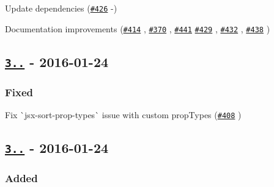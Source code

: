 \begin{DoxyItemize}
\item Update dependencies (\href{https://github.com/yannickcr/eslint-plugin-react/pull/426}{\tt \#426} -\/)
\item Documentation improvements (\href{https://github.com/yannickcr/eslint-plugin-react/pull/414}{\tt \#414} , \href{https://github.com/yannickcr/eslint-plugin-react/pull/370}{\tt \#370} , \href{https://github.com/yannickcr/eslint-plugin-react/pull/441}{\tt \#441} \href{https://github.com/yannickcr/eslint-plugin-react/pull/429}{\tt \#429} , \href{https://github.com/yannickcr/eslint-plugin-react/pull/432}{\tt \#432} , \href{https://github.com/yannickcr/eslint-plugin-react/pull/438}{\tt \#438} )
\end{DoxyItemize}

\subsection*{\href{https://github.com/yannickcr/eslint-plugin-react/compare/v3.16.0...v3.16.1}{\tt 3..} -\/ 2016-\/01-\/24}

\subsubsection*{Fixed}


\begin{DoxyItemize}
\item Fix \`{}jsx-\/sort-\/prop-\/types\`{} issue with custom prop\+Types (\href{https://github.com/yannickcr/eslint-plugin-react/issues/408}{\tt \#408} )
\end{DoxyItemize}

\subsection*{\href{https://github.com/yannickcr/eslint-plugin-react/compare/v3.15.0...v3.16.0}{\tt 3..} -\/ 2016-\/01-\/24}

\subsubsection*{Added}


